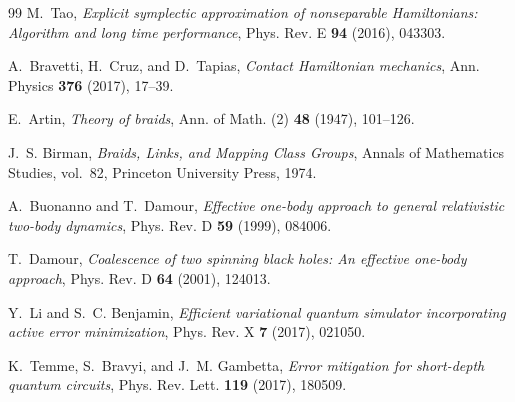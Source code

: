 \documentclass[11pt,a4paper,reqno]{article}
\theoremstyle{plain}
\theoremstyle{definition}
\theoremstyle{remark}
\numberwithin{equation}{section}
\begin{document}
\begin{thebibliography}{99}
M.~Tao, \emph{Explicit symplectic approximation of nonseparable Hamiltonians: Algorithm and long time performance}, Phys. Rev. E \textbf{94} (2016), 043303.

A.~Bravetti, H.~Cruz, and D.~Tapias, \emph{Contact Hamiltonian mechanics}, Ann. Physics \textbf{376} (2017), 17--39.

E.~Artin, \emph{Theory of braids}, Ann. of Math. (2) \textbf{48} (1947), 101--126.

J.~S. Birman, \emph{Braids, Links, and Mapping Class Groups}, Annals of Mathematics Studies, vol.~82, Princeton University Press, 1974.

A.~Buonanno and T.~Damour, \emph{Effective one-body approach to general relativistic two-body dynamics}, Phys. Rev. D \textbf{59} (1999), 084006.

T.~Damour, \emph{Coalescence of two spinning black holes: An effective one-body approach}, Phys. Rev. D \textbf{64} (2001), 124013.

Y.~Li and S.~C. Benjamin, \emph{Efficient variational quantum simulator incorporating active error minimization}, Phys. Rev. X \textbf{7} (2017), 021050.

K.~Temme, S.~Bravyi, and J.~M. Gambetta, \emph{Error mitigation for short-depth quantum circuits}, Phys. Rev. Lett. \textbf{119} (2017), 180509.

\end{thebibliography}
\end{document}

